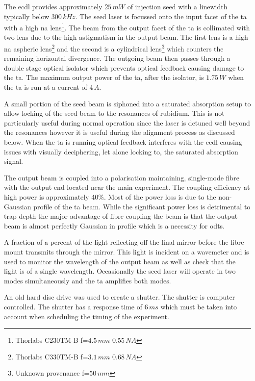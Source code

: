 The \gls{ecdl} provides approximately $25\,\unit{mW}$ of injection seed with a linewidth typically below $300\,\unit{kHz}$. The seed laser is focussed onto the input facet of the \gls{ta} with a high \gls{na} lens\footnote{Thorlabs C230TM-B f=$4.5\,\unit{mm}$ $0.55\,\unit{NA}$}. The beam from the output facet of the \gls{ta} is collimated with two lens due to the high astigmatism in the output beam. The first lens is a high \gls{na} aspheric lens\footnote{Thorlabs C330TM-B f=$3.1\,\unit{mm}$ $0.68\,\unit{NA}$} and the second is a cylindrical lens\footnote{Unknown provenance f=$50\,\unit{mm}$} which counters the remaining horizontal divergence. The outgoing beam then passes through a double stage optical isolator which prevents optical feedback causing damage to the \gls{ta}. The maximum output power of the \gls{ta}, after the isolator, is $1.75\,\unit{W}$ when the \gls{ta} is run at a current of $4\,\unit{A}$.

A small portion of the seed beam is siphoned into a saturated absorption setup\cite{maguire_theoretical_2006, haroche_theory_1972, preston_doppler-free_1996} to allow locking of the seed beam to the resonances of rubidium. This is not particularly useful during normal operation since the laser is detuned well beyond the resonances however it is useful during the alignment process as discussed below. When the \gls{ta} is running optical feedback interferes with the \gls{ecdl} causing issues with visually deciphering, let alone locking to, the saturated absorption signal.

The output beam is coupled into a polarisation maintaining, single-mode fibre with the output end located near the main experiment. The coupling efficiency at high power is approximately 40\%. Most of the power loss is due to the non-Gaussian profile of the \gls{ta} beam. While the significant power loss is detrimental to trap depth the major advantage of fibre coupling the beam is that the output beam is almost perfectly Gaussian in profile which is a necessity for \glspl{odt}.

A fraction of a percent of the light reflecting off the final mirror before the fibre mount transmits through the mirror. This light is incident on a wavemeter and is used to monitor the wavelength of the output beam as well as check that the light is of a single wavelength. Occasionally the seed laser will operate in two modes simultaneously and the \gls{ta} amplifies both modes.

An old hard disc drive was used to create a shutter\cite{scholten_enhanced_2007}. The shutter is computer controlled. The shutter has a response time of $6\,\unit{ms}$ which must be taken into account when scheduling the timing of the experiment.

